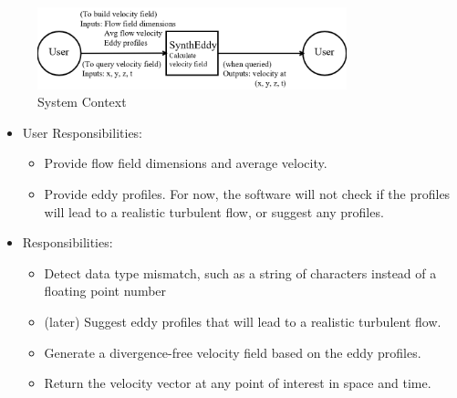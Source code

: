 \documentclass[12pt]{article}
\begin{document}
\begin{figure}[h!]
\begin{center}
 \includegraphics[width=0.8\textwidth]{SystemContextFigure-SynthEddy.png}
\caption{System Context}
\label{Fig_SystemContext} 
\end{center}
\end{figure}


\begin{itemize}
\item User Responsibilities:
\begin{itemize}
\item Provide flow field dimensions and average velocity.
\item Provide eddy profiles. For now, the software will not check if the profiles will lead to a realistic turbulent flow, or suggest any profiles.
\end{itemize}
\item \progname{} Responsibilities:
\begin{itemize}
\item Detect data type mismatch, such as a string of characters instead of a
  floating point number
\item (later) Suggest eddy profiles that will lead to a realistic turbulent flow.
\item Generate a divergence-free velocity field based on the eddy profiles.
\item Return the velocity vector at any point of interest in space and time.
\end{itemize}
\end{itemize}
\end{document}
